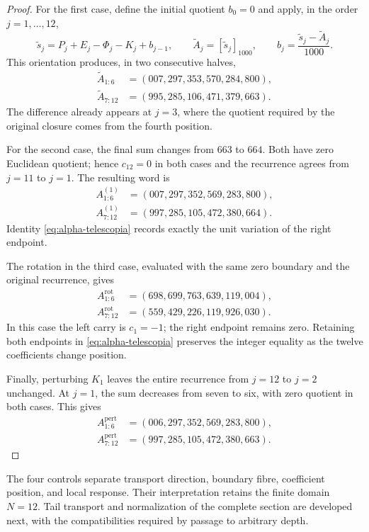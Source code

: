 \begin{proof}
For the first case, define the initial quotient \(b_0=0\) and
apply, in the order \(j=1,\ldots,12\),
\[
 \widetilde s_j=P_j+E_j-\Phi_j-K_j+b_{j-1},\qquad
 \widetilde A_j=[\widetilde s_j]_{1000},\qquad
 b_j=\frac{\widetilde s_j-\widetilde A_j}{1000}.
\]
This orientation produces, in two consecutive halves,
\begin{align*}
 \widetilde A_{1:6}&=(007,297,353,570,284,800),\\
 \widetilde A_{7:12}&=(995,285,106,471,379,663).
\end{align*}
The difference already appears at \(j=3\), where the quotient
required by the original closure comes from the fourth position.

For the second case, the final sum changes from \(663\) to \(664\).
Both have zero Euclidean quotient; hence \(c_{12}=0\) in both
cases and the recurrence agrees from \(j=11\) to \(j=1\).
The resulting word is
\begin{align*}
 A^{(1)}_{1:6}&=(007,297,352,569,283,800),\\
 A^{(1)}_{7:12}&=(997,285,105,472,380,664).
\end{align*}
Identity \eqref{eq:alpha-telescopia} records exactly the unit
variation of the right endpoint.

The rotation in the third case, evaluated with the same zero boundary
and the original recurrence, gives
\begin{align*}
 A^{\mathrm{rot}}_{1:6}&=(698,699,763,639,119,004),\\
 A^{\mathrm{rot}}_{7:12}&=(559,429,226,119,926,030).
\end{align*}
In this case the left carry is \(c_1=-1\); the right endpoint
remains zero. Retaining both endpoints in
\eqref{eq:alpha-telescopia} preserves the integer equality as the
twelve coefficients change position.

Finally, perturbing \(K_1\) leaves the entire recurrence from
\(j=12\) to \(j=2\) unchanged. At \(j=1\), the sum decreases
from seven to six, with zero quotient in both cases. This gives
\begin{align*}
 A^{\mathrm{pert}}_{1:6}&=(006,297,352,569,283,800),\\
 A^{\mathrm{pert}}_{7:12}&=(997,285,105,472,380,663).
\end{align*}
\end{proof}

The four controls separate transport direction, boundary fibre,
coefficient position, and local response. Their interpretation
retains the finite domain \(N=12\). Tail transport and normalization
of the complete section are developed next, with the compatibilities
required by passage to arbitrary depth.
